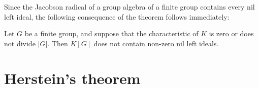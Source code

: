 Since the Jacobson radical of a group algebra of a finite group contains 
every nil left ideal, the following consequence of the theorem follows immediately:

\begin{corollary}
	\label{cor:GfinitoNOnil}
	Let $G$ be a finite group,
	and suppose that the characteristic
  	of $K$ is zero or does not divide $|G|$. 
    Then $K[G]$ does not contain non-zero nil left ideals. 
\end{corollary}



%
%
%


\section{Herstein's theorem}

